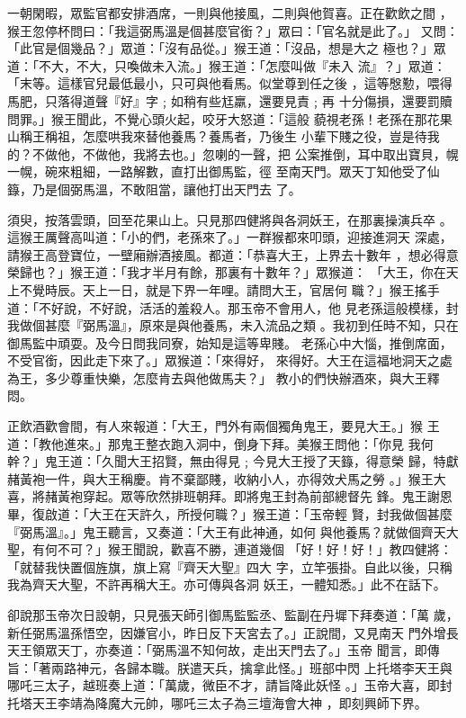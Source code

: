 \begin{pinyinscope}
{一朝閑暇，眾監官都安排酒席，一則與他接風，二則與他賀喜。正在歡飲之間
，猴王忽停杯問曰：「我這弼馬溫是個甚麼官銜？」眾曰：「官名就是此了。」
又問：「此官是個幾品？」眾道：「沒有品從。」猴王道：「沒品，想是大之
極也？」眾道：「不大，不大，只喚做未入流。」猴王道：「怎麼叫做『未入
流』？」眾道：「末等。這樣官兒最低最小，只可與他看馬。似堂尊到任之後
，這等慇懃，喂得馬肥，只落得道聲『好』字﹔如稍有些尪羸，還要見責﹔再
十分傷損，還要罰贖問罪。」猴王聞此，不覺心頭火起，咬牙大怒道：「這般
藐視老孫！老孫在那花果山稱王稱祖，怎麼哄我來替他養馬？養馬者，乃後生
小輩下賤之役，豈是待我的？不做他，不做他，我將去也。」忽喇的一聲，把
公案推倒，耳中取出寶貝，幌一幌，碗來粗細，一路解數，直打出御馬監，徑
至南天門。眾天丁知他受了仙籙，乃是個弼馬溫，不敢阻當，讓他打出天門去
了。

須臾，按落雲頭，回至花果山上。只見那四健將與各洞妖王，在那裏操演兵卒
。這猴王厲聲高叫道：「小的們，老孫來了。」一群猴都來叩頭，迎接進洞天
深處，請猴王高登寶位，一壁廂辦酒接風。都道：「恭喜大王，上界去十數年
，想必得意榮歸也？」猴王道：「我才半月有餘，那裏有十數年？」眾猴道：
「大王，你在天上不覺時辰。天上一日，就是下界一年哩。請問大王，官居何
職？」猴王搖手道：「不好說，不好說，活活的羞殺人。那玉帝不會用人，他
見老孫這般模樣，封我做個甚麼『弼馬溫』，原來是與他養馬，未入流品之類
。我初到任時不知，只在御馬監中頑耍。及今日問我同寮，始知是這等卑賤。
老孫心中大惱，推倒席面，不受官銜，因此走下來了。」眾猴道：「來得好，
來得好。大王在這福地洞天之處為王，多少尊重快樂，怎麼肯去與他做馬夫？」
教小的們快辦酒來，與大王釋悶。

正飲酒歡會間，有人來報道：「大王，門外有兩個獨角鬼王，要見大王。」猴
王道：「教他進來。」那鬼王整衣跑入洞中，倒身下拜。美猴王問他：「你見
我何幹？」鬼王道：「久聞大王招賢，無由得見﹔今見大王授了天籙，得意榮
歸，特獻赭黃袍一件，與大王稱慶。肯不棄鄙賤，收納小人，亦得效犬馬之勞
。」猴王大喜，將赭黃袍穿起。眾等欣然排班朝拜。即將鬼王封為前部總督先
鋒。鬼王謝恩畢，復啟道：「大王在天許久，所授何職？」猴王道：「玉帝輕
賢，封我做個甚麼『弼馬溫』。」鬼王聽言，又奏道：「大王有此神通，如何
與他養馬？就做個齊天大聖，有何不可？」猴王聞說，歡喜不勝，連道幾個
「好！好！好！」教四健將：「就替我快置個旌旗，旗上寫『齊天大聖』四大
字，立竿張掛。自此以後，只稱我為齊天大聖，不許再稱大王。亦可傳與各洞
妖王，一體知悉。」此不在話下。

卻說那玉帝次日設朝，只見張天師引御馬監監丞、監副在丹墀下拜奏道：「萬
歲，新任弼馬溫孫悟空，因嫌官小，昨日反下天宮去了。」正說間，又見南天
門外增長天王領眾天丁，亦奏道：「弼馬溫不知何故，走出天門去了。」玉帝
聞言，即傳旨：「著兩路神元，各歸本職。朕遣天兵，擒拿此怪。」班部中閃
上托塔李天王與哪吒三太子，越班奏上道：「萬歲，微臣不才，請旨降此妖怪
。」玉帝大喜，即封托塔天王李靖為降魔大元帥，哪吒三太子為三壇海會大神
，即刻興師下界。

}
\end{pinyinscope}
